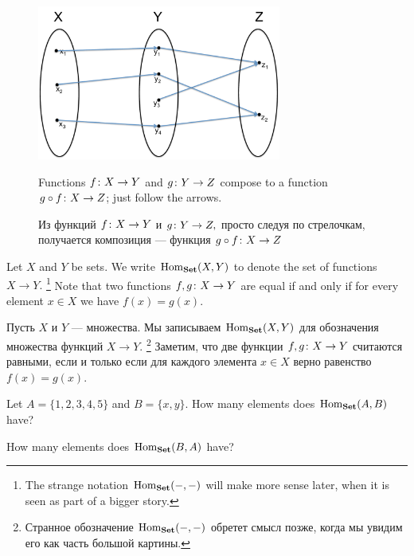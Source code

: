 \documentclass[../main/CT4S-EN-RU]{subfiles}
\begin{document}
\begin{figure}[h]
\begin{center}
\includegraphics[height=2in]{composition}
\end{center}
\begin{blockENG}
\caption{Functions $f\colon X\rightarrow Y$ and $g\colon Y\rightarrow Z$ compose to a function $g\circ f\colon X\rightarrow Z$; just follow the arrows.}
\end{blockENG}
\begin{blockRUS}
\caption{Из функций $f\colon X\rightarrow Y$ и $g\colon Y\rightarrow Z,$ просто следуя по стрелочкам, получается композиция — функция $g\circ f\colon X\rightarrow Z$}
\end{blockRUS}
\end{figure}

\begin{blockENG}
Let $X$ and $Y$ be sets. We write $\operatorname{Hom}_{\mathbf{Set}}(X,Y)$ to denote the set of functions $X\to Y.$%
\footnote{The strange notation $\operatorname{Hom}_{\mathbf{Set}}(-,-)$ will make more sense later, when it is seen as part of a bigger story.} 
Note that two functions $f,g\colon X\rightarrow Y$ are equal if and only if for every element $x\in X$ we have $f(x)=g(x).$ 
\end{blockENG}

\begin{blockRUS}
Пусть $X$ и $Y$ — множества. Мы записываем $\operatorname{Hom}_{\mathbf{Set}}(X,Y)$ для обозначения множества функций $X\to Y.$%
\footnote{Странное обозначение $\operatorname{Hom}_{\mathbf{Set}}(-,-)$ обретет смысл позже, когда мы увидим его как часть большой картины.} 
Заметим, что две функции $f,g\colon X\rightarrow Y$ считаются равными, если и только если для каждого элемента $x\in X$ верно равенство $f(x)=g(x).$ 
\end{blockRUS}

\begin{exerciseENG}
Let $A=\{1,2,3,4,5\}$ and $B=\{x,y\}.$ 
\sexc How many elements does $\operatorname{Hom}_{\mathbf{Set}}(A,B)$ have? 
\item How many elements does $\operatorname{Hom}_{\mathbf{Set}}(B,A)$ have?
\endsexc
\end{exerciseENG}
\end{document}
